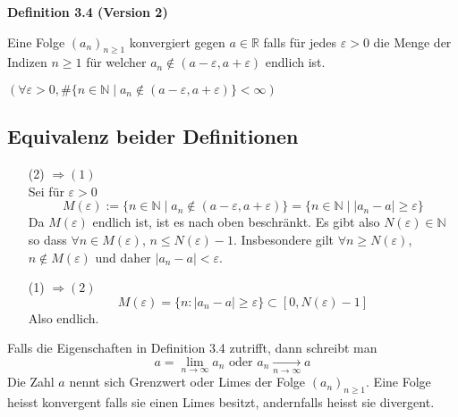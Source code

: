 \begin{framed}
\centerline{\textbf{Definition 3.4 (Version 2)}}
\noindent Eine Folge $(a_n)_{n\geq 1}$ konvergiert gegen $a\in\mathbb{R}$ falls für jedes $\varepsilon>0$ die Menge der Indizen $n\geq 1$ für welcher $a_n\not\in (a-\varepsilon,a+\varepsilon)$ endlich ist.\\

\centerline{$\left( \forall\varepsilon>0, \#\{ n\in\mathbb{N}\mid a_n\not\in (a-\varepsilon,a+\varepsilon)\} <\infty\right)$}
\end{framed}

\subsection*{Equivalenz beider Definitionen}
\begin{enumerate}

\item[(2)] $\Rightarrow(1)$ \\Sei für  $\varepsilon>0$ $$M(\varepsilon):=\{ n\in\mathbb{N}\mid a_n\not\in (a-\varepsilon,a+\varepsilon)\}=\{n\in\mathbb{N}\mid \left| a_n-a \right|\geq \varepsilon\}$$
Da $M(\varepsilon)$ endlich ist, ist es nach oben beschränkt. Es  gibt also $N(\varepsilon)\in\mathbb{N}$ so dass $\forall n\in M(\varepsilon)$, $n\leq N(\varepsilon)-1$. Insbesondere gilt $\forall n\geq N(\varepsilon)$, $n\not\in M(\varepsilon)$ und daher $\left| a_n-a\right|<\varepsilon$.
\item[(1)] $\Rightarrow(2)$ $$M(\varepsilon)=\{ n:\left| a_n-a\right| \geq \varepsilon\} \subset \left[ 0,N(\varepsilon)-1 \right]$$ Also endlich.
\end{enumerate}

\noindent Falls die Eigenschaften in Definition 3.4 zutrifft, dann schreibt man\[a = \mathop {\lim }\limits_{n \to \infty } {a_n}{\text{ oder }}{a_n}\mathop  \to \limits_{n \to \infty } a\] Die Zahl $a$ nennt sich Grenzwert oder Limes der Folge $(a_n)_{n\geq 1}$. Eine Folge heisst konvergent falls sie einen Limes besitzt, andernfalls heisst sie divergent.

